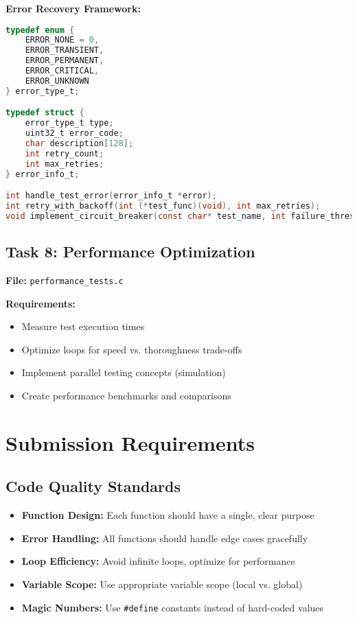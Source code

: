 \documentclass[11pt,a4paper]{article}
\begin{document}
\textbf{Error Recovery Framework:}
\begin{lstlisting}[language=C]
typedef enum {
    ERROR_NONE = 0,
    ERROR_TRANSIENT,
    ERROR_PERMANENT,
    ERROR_CRITICAL,
    ERROR_UNKNOWN
} error_type_t;

typedef struct {
    error_type_t type;
    uint32_t error_code;
    char description[128];
    int retry_count;
    int max_retries;
} error_info_t;

int handle_test_error(error_info_t *error);
int retry_with_backoff(int (*test_func)(void), int max_retries);
void implement_circuit_breaker(const char* test_name, int failure_threshold);
\end{lstlisting}

\subsection{Task 8: Performance Optimization}

\textbf{File:} \texttt{performance\_tests.c}

\textbf{Requirements:}
\begin{itemize}
    \item Measure test execution times
    \item Optimize loops for speed vs. thoroughness trade-offs
    \item Implement parallel testing concepts (simulation)
    \item Create performance benchmarks and comparisons
\end{itemize}

\section{Submission Requirements}

\subsection{Code Quality Standards}
\begin{itemize}
    \item \textbf{Function Design:} Each function should have a single, clear purpose
    \item \textbf{Error Handling:} All functions should handle edge cases gracefully
    \item \textbf{Loop Efficiency:} Avoid infinite loops, optimize for performance
    \item \textbf{Variable Scope:} Use appropriate variable scope (local vs. global)
    \item \textbf{Magic Numbers:} Use \texttt{\#define} constants instead of hard-coded values
\end{itemize}
\end{document}
